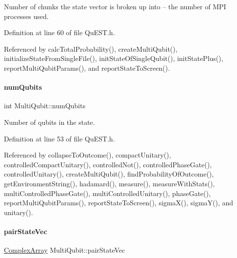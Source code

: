 Number of chunks the state vector is broken up into -- the number of M\+PI processes used. 



Definition at line 60 of file Qu\+E\+S\+T.\+h.



Referenced by calc\+Total\+Probability(), create\+Multi\+Qubit(), initialize\+State\+From\+Single\+File(), init\+State\+Of\+Single\+Qubit(), init\+State\+Plus(), report\+Multi\+Qubit\+Params(), and report\+State\+To\+Screen().

\mbox{\label{structMultiQubit_ab5b9795bdc6fb5855e1974dcbbaeb36f}} 
\paragraph{\texorpdfstring{num\+Qubits}{numQubits}}
{\footnotesize\ttfamily int Multi\+Qubit\+::num\+Qubits}



Number of qubits in the state. 



Definition at line 53 of file Qu\+E\+S\+T.\+h.



Referenced by collapse\+To\+Outcome(), compact\+Unitary(), controlled\+Compact\+Unitary(), controlled\+Not(), controlled\+Phase\+Gate(), controlled\+Unitary(), create\+Multi\+Qubit(), find\+Probability\+Of\+Outcome(), get\+Environment\+String(), hadamard(), measure(), measure\+With\+Stats(), multi\+Controlled\+Phase\+Gate(), multi\+Controlled\+Unitary(), phase\+Gate(), report\+Multi\+Qubit\+Params(), report\+State\+To\+Screen(), sigma\+X(), sigma\+Y(), and unitary().

\mbox{\label{structMultiQubit_a76f7db4eab52d2b30f58f973ada809c5}} 
\paragraph{\texorpdfstring{pair\+State\+Vec}{pairStateVec}}
{\footnotesize\ttfamily \mbox{\hyperlink{structComplexArray}{Complex\+Array}} Multi\+Qubit\+::pair\+State\+Vec}



